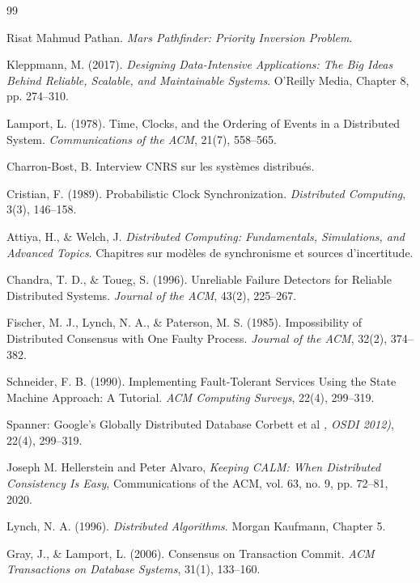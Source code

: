 \documentclass[12pt,a4paper]{article}
\begin{document}
\newpage
\begin{thebibliography}{99}

Risat Mahmud Pathan. \textit{Mars Pathfinder: Priority Inversion Problem}.

Kleppmann, M. (2017). \textit{Designing Data-Intensive Applications: The Big Ideas Behind Reliable, Scalable, and Maintainable Systems}. O'Reilly Media, Chapter 8, pp. 274--310.

Lamport, L. (1978). Time, Clocks, and the Ordering of Events in a Distributed System. \textit{Communications of the ACM}, 21(7), 558--565.

Charron-Bost, B. Interview CNRS sur les systèmes distribués.

Cristian, F. (1989). Probabilistic Clock Synchronization. \textit{Distributed Computing}, 3(3), 146--158.

Attiya, H., \& Welch, J. \textit{Distributed Computing: Fundamentals, Simulations, and Advanced Topics}. Chapitres sur modèles de synchronisme et sources d'incertitude.

Chandra, T. D., \& Toueg, S. (1996). Unreliable Failure Detectors for Reliable Distributed Systems. \textit{Journal of the ACM}, 43(2), 225--267.

Fischer, M. J., Lynch, N. A., \& Paterson, M. S. (1985). Impossibility of Distributed Consensus with One Faulty Process. \textit{Journal of the ACM}, 32(2), 374--382.

Schneider, F. B. (1990). Implementing Fault-Tolerant Services Using the State Machine Approach: A Tutorial. \textit{ACM Computing Surveys}, 22(4), 299--319.

Spanner: Google’s Globally Distributed Database Corbett et al \textit{, OSDI 2012)}, 22(4), 299--319.

Joseph M. Hellerstein and Peter Alvaro,
\textit{Keeping CALM: When Distributed Consistency Is Easy},
Communications of the ACM, vol. 63, no. 9, pp. 72--81, 2020.

Lynch, N. A. (1996). \textit{Distributed Algorithms}. Morgan Kaufmann, Chapter 5.

Gray, J., \& Lamport, L. (2006). Consensus on Transaction Commit. \textit{ACM Transactions on Database Systems}, 31(1), 133--160.


\end{thebibliography}
\end{document}
